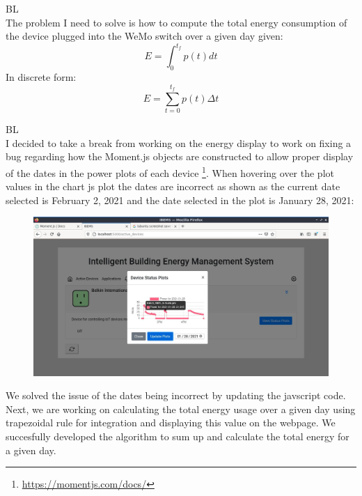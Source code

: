 \documentclass[fontsize=11pt, %
                             paper=letter, %
                             openany, %
                             captions=tableheading,
                             index=totoc,
                             hyperref]{labbook}
\begin{document}
BL\\
The problem I need to solve is how to compute the total energy consumption of the device plugged into the WeMo switch over a given day given:
\[
E = \int_0^{t_f} p(t)dt
\]
In discrete form:
\[
E = \sum_{t = 0}^{t_f} p(t)\Delta t
\]

 
BL\\
I decided to take a break from working on the energy display to work on fixing a
bug regarding how the Moment.js objects are constructed to allow proper display
of the dates in the power plots of each device
\footnote{\url{https://momentjs.com/docs/}}. When hovering over the plot values
in the chart js plot the dates are incorrect as shown as the current date
selected is February 2, 2021 and the date selected in the plot is January 28,
2021:
\begin{figure}[H]
\centering
\includegraphics[scale=0.4]{figs/img/badDate.jpg}
\end{figure}   
We solved the issue of the dates being incorrect by updating the javscript code. Next, we are working on calculating the total energy usage over a given day using trapezoidal rule for integration and displaying this value on the webpage. We succesfully developed the algorithm to sum up and calculate the total energy for a given day.
\end{document}
